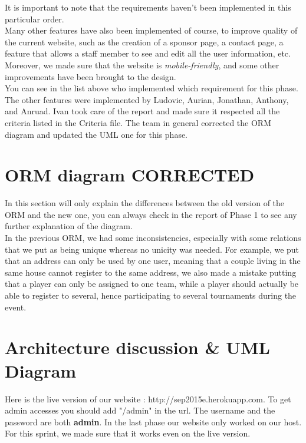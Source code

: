 \documentclass[a4paper, 12pt]{article}
\begin{document}
It is important to note that the requirements haven't been implemented in this particular order.\\

Many other features have also been implemented of course, to improve quality of the current website, such as the creation of a sponsor page, a contact page, a feature that allows a staff member to see and edit all the user information, etc. Moreover, we made sure that the website is \textit{mobile-friendly}, and some other improvements have been brought to the design.\\

You can see in the list above who implemented which requirement for this phase. The other features were implemented by Ludovic, Aurian, Jonathan, Anthony, and Anruad. Ivan took care of the report and made sure it respected all the criteria listed in the Criteria file. The team in general corrected the ORM diagram and updated the UML one for this phase. \\

\section{ORM diagram CORRECTED}

In this section will only explain the differences between the old version of the ORM and the new one, you can always check in the report of Phase 1 to see any further explanation of the diagram. \\

In the previous ORM, we had some inconsistencies, especially with some relations that we put as being unique whereas no unicity was needed. For example, we put that an address can only be used by one user, meaning that a couple living in the same house cannot register to the same address, we also made a mistake putting that a player can only be assigned to one team, while a player should actually be able to register to several, hence participating to several tournaments during the event.
 

\section{Architecture discussion \& UML Diagram}

Here is the live version of our website : http://sep2015e.herokuapp.com.  To get admin accesses you should add "/admin" in the url. The username and the password are both \textbf{admin}. In the last phase our website only worked on our host. For this sprint, we made sure that it works even on the live version.\\
\end{document}
